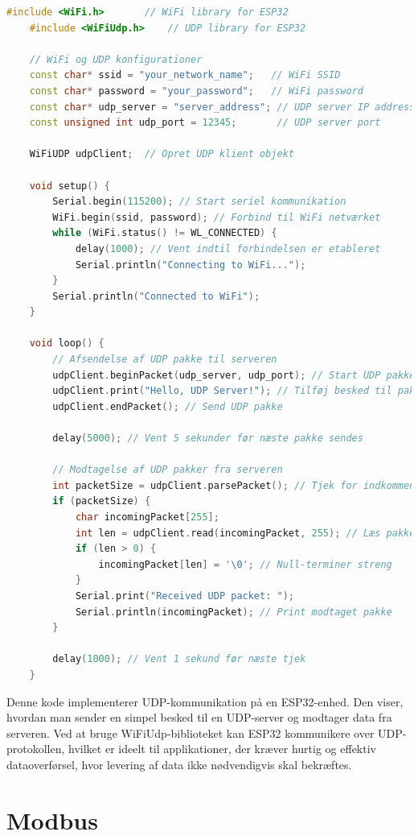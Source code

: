 \begin{lstlisting}[language=C++, caption=ESP32 integration med UDP]
	#include <WiFi.h>       // WiFi library for ESP32
	#include <WiFiUdp.h>    // UDP library for ESP32
	
	// WiFi og UDP konfigurationer
	const char* ssid = "your_network_name";   // WiFi SSID
	const char* password = "your_password";   // WiFi password
	const char* udp_server = "server_address"; // UDP server IP address
	const unsigned int udp_port = 12345;       // UDP server port
	
	WiFiUDP udpClient;  // Opret UDP klient objekt
	
	void setup() {
		Serial.begin(115200); // Start seriel kommunikation
		WiFi.begin(ssid, password); // Forbind til WiFi netværket
		while (WiFi.status() != WL_CONNECTED) {
			delay(1000); // Vent indtil forbindelsen er etableret
			Serial.println("Connecting to WiFi...");
		}
		Serial.println("Connected to WiFi");
	}
	
	void loop() {
		// Afsendelse af UDP pakke til serveren
		udpClient.beginPacket(udp_server, udp_port); // Start UDP pakke
		udpClient.print("Hello, UDP Server!"); // Tilføj besked til pakken
		udpClient.endPacket(); // Send UDP pakke
		
		delay(5000); // Vent 5 sekunder før næste pakke sendes
		
		// Modtagelse af UDP pakker fra serveren
		int packetSize = udpClient.parsePacket(); // Tjek for indkommende pakke
		if (packetSize) {
			char incomingPacket[255];
			int len = udpClient.read(incomingPacket, 255); // Læs pakken ind i buffer
			if (len > 0) {
				incomingPacket[len] = '\0'; // Null-terminer streng
			}
			Serial.print("Received UDP packet: ");
			Serial.println(incomingPacket); // Print modtaget pakke
		}
		
		delay(1000); // Vent 1 sekund før næste tjek
	}
\end{lstlisting}
Denne kode implementerer UDP-kommunikation på en ESP32-enhed. Den viser, hvordan man sender en simpel besked til en UDP-server og modtager data fra serveren. Ved at bruge WiFiUdp-biblioteket kan ESP32 kommunikere over UDP-protokollen, hvilket er ideelt til applikationer, der kræver hurtig og effektiv dataoverførsel, hvor levering af data ikke nødvendigvis skal bekræftes.




\chapter{Modbus}
